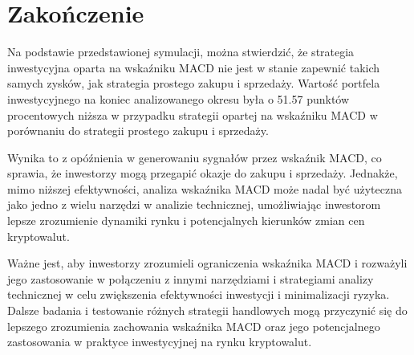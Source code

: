 \documentclass{article}
\begin{document}
    \section*{Zakończenie}

    Na podstawie przedstawionej symulacji, można stwierdzić, że strategia inwestycyjna oparta na wskaźniku MACD nie jest w stanie zapewnić takich samych zysków, jak strategia prostego zakupu i sprzedaży. Wartość portfela inwestycyjnego na koniec analizowanego okresu była o 51.57 punktów procentowych niższa w przypadku strategii opartej na wskaźniku MACD w porównaniu do strategii prostego zakupu i sprzedaży.

    Wynika to z opóźnienia w generowaniu sygnałów przez wskaźnik MACD, co sprawia, że inwestorzy mogą przegapić okazje do zakupu i sprzedaży. Jednakże, mimo niższej efektywności, analiza wskaźnika MACD może nadal być użyteczna jako jedno z wielu narzędzi w analizie technicznej, umożliwiając inwestorom lepsze zrozumienie dynamiki rynku i potencjalnych kierunków zmian cen kryptowalut.

    Ważne jest, aby inwestorzy zrozumieli ograniczenia wskaźnika MACD i rozważyli jego zastosowanie w połączeniu z innymi narzędziami i strategiami analizy technicznej w celu zwiększenia efektywności inwestycji i minimalizacji ryzyka. Dalsze badania i testowanie różnych strategii handlowych mogą przyczynić się do lepszego zrozumienia zachowania wskaźnika MACD oraz jego potencjalnego zastosowania w praktyce inwestycyjnej na rynku kryptowalut.
\end{document}
